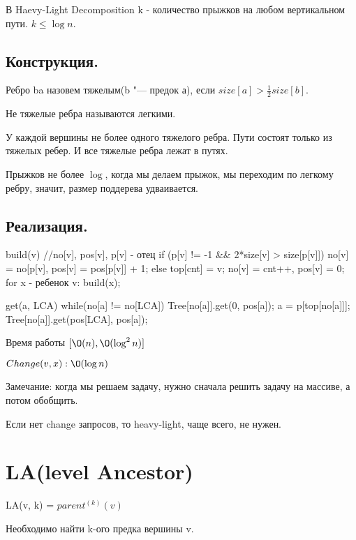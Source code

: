 В Haevy-Light Decomposition k - количество прыжков на любом вертикальном пути. $k \le \log n$.

\subsection{Конструкция.}
\begin{Def}
Ребро ba назовем тяжелым(b "--- предок а), если $size[a]>\frac{1}{2}size[b]$. 
\end{Def}
\begin{Def}
Не тяжелые ребра называются легкими.
\end{Def}

У каждой вершины не более одного тяжелого ребра.
Пути состоят только из тяжелых ребер.  И все тяжелые ребра лежат в путях. 

Прыжков не более $\log$, когда мы делаем прыжок, мы переходим по легкому ребру, значит, размер поддерева удваивается. 

\subsection{Реализация.}

\begin{cppcode}
build(v){ //no[v], pos[v], p[v] - отец
    if (p[v] != -1 && 2*size[v] > size[p[v]])  {
        no[v] = no[p[v], pos[v] = pos[p[v]] + 1;
    } else {
        top[cnt] = v;
        no[v] = cnt++, pos[v] = 0;
    }
    for x - ребенок v: build(x);
}

get(a, LCA) {
    while(no[a] != no[LCA]) {
        Tree[no[a]].get(0, pos[a]);
        a = p[top[no[a]]];
    }
    Tree[no[a]].get(pos[LCA], pos[a]);
}                                                                                                                 
\end{cppcode}


Время работы $[\O(n), \O(\log^2 n)]$

$Change(v, x): \O(\log n)$

Замечание: когда мы решаем задачу, нужно сначала решить задачу на массиве, а потом обобщить. 

Если нет change запросов, то heavy-light, чаще всего, не нужен. 

\section{LA(level Ancestor)}

\begin{Def}
LA(v, k) = $parent^{(k)}(v)$

Необходимо найти k-ого предка вершины v. 
\end{Def}

